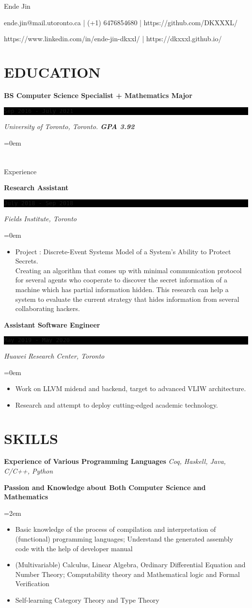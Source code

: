 \documentclass[fontsize=11pt]{article}
\newcommand{\MyName}[1]{ %
    \Huge \usefont{OT1}{phv}{b}{n} \hfill #1
    \par \normalsize \normalfont}
\newcommand{\NewPart}[1]{\section*{\uppercase{#1}}}
\newcommand{\SkillEntry}[2]{       %
    \noindent \textbf{#1} \hfill      %
        \noindent \textit{#2} \par        %
}
\newcommand{\SkillsEntry}[4]{       %
    \noindent \textbf{#1} \hfill      %
        \noindent \textit{#2} \par        %
    \noindent\hangindent=2em\hangafter=0 \small #4 %
    \normalsize \par}
\newcommand{\EducationEntry}[4]{
    \noindent \textbf{#1} \hfill      %
    \colorbox{Black}{ 
      \parbox{11em}{
      \centering \color{White}#2}} \par  %
    \noindent \textit{#3} \par        %
    \noindent\hangindent=0em\hangafter=0 \small #4 %
    \normalsize \par}
\newcommand{\WorkEntry}[4]{       %
    \noindent \textbf{#1} \hfill      %
    \colorbox{Black}{%
      \parbox{11em}{%
      \centering\color{White}#2}} \par   %
        \noindent \textit{#3} \par        %
    \noindent\hangindent=0em\hangafter=0 \small #4 %
    \normalsize \par}
\begin{document}
    
\MyName{Ende Jin}
\bigskip
{\small \hfill ende.jin@mail.utoronto.ca | (+1) 6476854680 | https://github.com/DKXXXL/ \par
 \hfill  https://www.linkedin.com/in/ende-jin-dkxxl/ | https://dkxxxl.github.io/}
\NewPart{Education}{}
\EducationEntry
{BS Computer Science Specialist + Mathematics Major}
{ \texttt{Sep 2016 - July 2021} }
{University of Toronto, Toronto.    \bf{GPA 3.92}}

\NewPart{Experience}{}

\WorkEntry
{Research Assistant}
{\texttt{July 2018 - Sep 2018}}
{Fields Institute, Toronto}
{\begin{itemize} \itemsep -1pt
    \item Project : Discrete-Event Systems Model of a System’s Ability to Protect Secrets. 
    \\ Creating an algorithm that comes up with minimal communication protocol for several agents who cooperate to discover the secret information of a machine which has partial information hidden. This research can help a system to evaluate the current strategy that hides information from several collaborating hackers.
    \end{itemize}}
    
\WorkEntry
{Assistant Software Engineer}
{\texttt{May 2019 - May 2020}}
{Huawei Research Center, Toronto}
{\begin{itemize} \itemsep -1pt
    \item Work on LLVM midend and backend, target to advanced VLIW architecture.
    \item Research and attempt to deploy cutting-edged academic technology.  
	\end{itemize}}
\NewPart{Skills}{}
\SkillEntry{Experience of Various Programming Languages}{Coq, Haskell, Java, C/C++, Python}

\SkillsEntry{Passion and Knowledge about Both Computer Science and Mathematics}{}{}{
    \begin{itemize} \itemsep -1pt
        \item Basic knowledge of the process of compilation and interpretation of (functional) programming languages;
        Understand the generated assembly code with the help of developer manual
        \item (Multivariable) Calculus, Linear Algebra, Ordinary Differential Equation and Number Theory; 
        Computability theory and Mathematical logic and Formal Verification
        \item Self-learning Category Theory and Type Theory
    \end{itemize}
}
\end{document}
